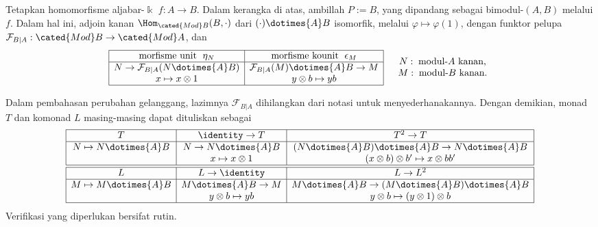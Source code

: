 
\hypertarget{o014.aljabr2.chapter7.morita-theory-b}{ }
\begin{example}\label{eg:comonad-change-ring}
	Tetapkan homomorfisme aljabar-$\Bbbk$ $f:A\to B$. Dalam kerangka di atas,
	ambillah $P:=B$, yang dipandang sebagai bimodul-$(A,B)$ melalui $f$. Dalam
	hal ini, adjoin kanan $\Hom_{\cated{Mod}B}(B,\mathord\cdot)$ dari
	$(\mathord\cdot)\dotimes{A}B$ isomorfik, melalui
	$\varphi\mapsto\varphi(1)$, dengan funktor pelupa
	$\mathcal{F}_{B|A}:\cated{Mod}B\to\cated{Mod}A$, dan
	\[\begin{array}{|c|c|} \hline
		\text{morfisme unit }\; \eta_N & \text{morfisme kounit }\; \epsilon_M \\ \hline
		N \to \mathcal{F}_{B|A}(N \dotimes{A} B) & \mathcal{F}_{B|A}(M) \dotimes{A} B \to M \\
		x \mapsto x \otimes 1 & y \otimes b \mapsto yb \\ \hline
	\end{array} \quad \begin{array}{c}
		N: \;\text{modul-$A$ kanan,} \\
		M: \;\text{modul-$B$ kanan.}
	\end{array}\]

	Dalam pembahasan perubahan gelanggang, lazimnya $\mathcal{F}_{B|A}$
	dihilangkan dari notasi untuk menyederhanakannya. Dengan demikian, monad
	$T$ dan komonad $L$ masing-masing dapat dituliskan sebagai
	\[\begin{array}{|c|c|c|} \hline
		T & \identity \to T & T^2 \to T \\ \hline
		N \mapsto N \dotimes{A} B & N \to N \dotimes{A} B & (N \dotimes{A} B) \dotimes{A} B \to N \dotimes{A} B \\
		& x \mapsto x \otimes 1 & (x \otimes b) \otimes b' \mapsto x \otimes bb' \\ \hline\hline
		L & L \to \identity & L \to L^2 \\ \hline
		M \mapsto M \dotimes{A} B & M \dotimes{A} B \to M & M \dotimes{A} B \to (M \dotimes{A} B) \dotimes{A} B \\
		& y \otimes b \mapsto yb & y \otimes b \mapsto (y \otimes 1) \otimes b \\ \hline
	\end{array}\]
	Verifikasi yang diperlukan bersifat rutin.
\end{example}

